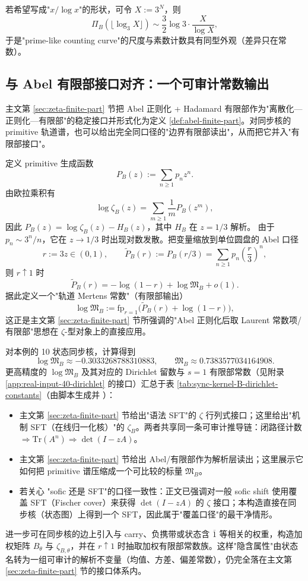 若希望写成"$x/\log x$"的形状，可令 $X:=3^N$，则
\[
\Pi_B(\lfloor \log_3 X\rfloor)\sim \frac{3}{2}\log 3\cdot \frac{X}{\log X},
\]
于是"prime-like counting curve"的尺度与素数计数具有同型外观（差异只在常数）。

\subsection{与 Abel 有限部接口对齐：一个可审计常数输出}
主文第 \ref{sec:zeta-finite-part} 节把 Abel 正则化 + Hadamard 有限部作为"离散化—正则化—有限部"的稳定接口并形式化为定义 \ref{def:abel-finite-part}。对同步核的 primitive 轨道谱，也可以给出完全同口径的"边界有限部读出"，从而把它并入"有限部接口"。

定义 primitive 生成函数
\[
P_B(z):=\sum_{n\ge 1}p_n z^n.
\]
由欧拉乘积有
\[
\log\zeta_B(z)=\sum_{m\ge 1}\frac{1}{m}P_B(z^m),
\]
因此 $P_B(z)=\log\zeta_B(z)-H_B(z)$，其中 $H_B$ 在 $z=1/3$ 解析。
由于 $p_n\sim 3^n/n$，它在 $z\to 1/3$ 时出现对数发散。把变量缩放到单位圆盘的 Abel 口径
\[
r:=3z\in(0,1),\qquad
\widetilde P_B(r):=P_B(r/3)=\sum_{n\ge 1}p_n\left(\frac{r}{3}\right)^n,
\]
则 $r\uparrow 1$ 时
\[
\widetilde P_B(r)= -\log(1-r)+\log\mathfrak{M}_B+o(1).
\]
据此定义一个"轨道 Mertens 常数"（有限部输出）
\[
\log\mathfrak{M}_B
:=\mathrm{fp}_{r=1}\bigl(\widetilde P_B(r)+\log(1-r)\bigr),
\]
这正是主文第 \ref{sec:zeta-finite-part} 节所强调的"Abel 正则化后取 Laurent 常数项/有限部"思想在 $\zeta$-型对象上的直接应用。

对本例的 10 状态同步核，计算得到
\[
\log \mathfrak{M}_B\approx -0.3033268788310883,
\qquad
\mathfrak{M}_B\approx 0.7383577034164908.
\]
更高精度的 $\log\mathfrak{M}_B$ 及其对应的 Dirichlet 留数与 $s=1$ 有限部常数（见附录 \ref{app:real-input-40-dirichlet} 的接口）汇总于表 \ref{tab:sync-kernel-B-dirichlet-constants}（由脚本生成并 \verb||）：


\begin{remark}
\begin{itemize}
  \item 主文第 \ref{sec:zeta-finite-part} 节给出"语法 SFT"的 $\zeta$ 行列式接口；这里给出"机制 SFT（在线归一化核）"的 $\zeta_B$。两者共享同一条可审计推导链：闭路径计数 $\Rightarrow \mathrm{Tr}(A^n) \Rightarrow \det(I-zA)$。
  \item 主文第 \ref{sec:zeta-finite-part} 节给出 Abel/有限部作为解析层读出；这里展示它如何把 primitive 谱压缩成一个可比较的标量 $\mathfrak{M}_B$。
  \item 若关心 "sofic 还是 SFT"的口径一致性：正文已强调对一般 sofic shift 使用覆盖 SFT（Fischer cover）来获得 $\det(I-zA)$ 的 $\zeta$ 接口；本构造直接在同步核（状态图）上得到一个 SFT，因此属于"覆盖口径"的最干净情形。
\end{itemize}
\end{remark}

\begin{remark}
进一步可在同步核的边上引入与 carry、负携带或状态含 $\overline{1}$ 等相关的权重，构造加权矩阵 $B_\theta$ 与 $\zeta_{B,\theta}$，并在 $r\uparrow 1$ 时抽取加权有限部常数族。这样"隐含属性"由状态名转为一组可审计的解析不变量（均值、方差、偏差常数），仍完全落在主文第 \ref{sec:zeta-finite-part} 节的接口体系内。
\end{remark}
